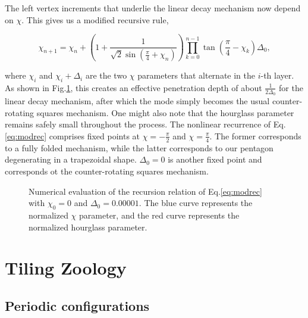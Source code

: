 			The left vertex increments that underlie the linear decay mechanism now depend on $\chi$. This gives us a modified recursive rule,
			
			\begin{equation}
				\chi_{n+1} = \chi_{n} + (1 + \frac{1}{\sqrt{2}\sin(\frac{\pi}{4}+\chi_{n})})\prod^{n-1}_{k=0}\tan(\frac{\pi}{4}-\chi_k)\Delta_0,
				\label{eq:modrec}
			\end{equation}
			
			where $\chi_i$ and $\chi_i + \Delta_i$ are the two $\chi$ parameters that alternate in the $i$-th layer. As shown in Fig.\ref{fig:lindecsaturation}, this creates an effective penetration depth of about $\frac{1}{2\Delta_0}$ for the linear decay mechanism, after which the mode simply becomes the usual counter-rotating squares mechanism. One might also note that the hourglass parameter remains safely small throughout the process. The nonlinear recurrence of Eq.\ref{eq:modrec} comprises fixed points at $\chi=-\frac{\pi}{2}$ and $\chi=\frac{\pi}{4}$. The former corresponds to a fully folded mechanism, while the latter corresponds to our pentagon degenerating in a trapezoidal shape. $\Delta_0=0$ is another fixed point and corresponds ot the counter-rotating squares mechanism.
			
			
			
			\begin{figure}[!ht]
				\caption{Numerical evaluation of the recursion relation of Eq.\ref{eq:modrec} with $\chi_0=0$ and $\Delta_0=0.00001$. The blue curve represents the normalized $\chi$ parameter, and the red curve represents the  normalized hourglass parameter.}
				\label{fig:lindecsaturation}
			\end{figure}
			

\chapter{Tiling Zoology}

\section{Periodic configurations}
	\label{sec:periodic}
	
